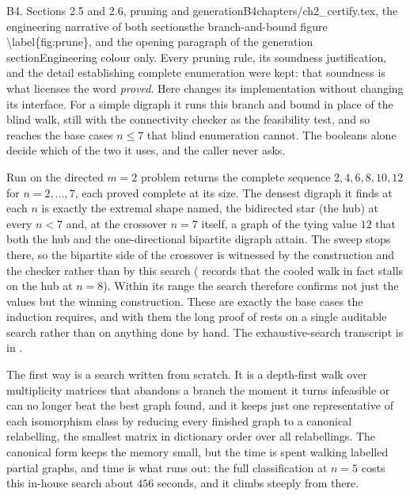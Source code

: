 \begin{offcutrewrite}{B4. Sections 2.5 and 2.6, pruning and generation}{B4}{chapters/ch2\_certify.tex, the engineering narrative of both sections}{the branch-and-bound figure \textbackslash{}label\{fig:prune\}, and the opening paragraph of the generation section}{Engineering colour only. Every pruning rule, its soundness justification, and the detail establishing complete enumeration were kept: that soundness is what licenses the word \emph{proved}.}
Here  changes its implementation without changing its interface. For a simple digraph it runs this branch and bound in place of the blind walk, still with the connectivity checker as the feasibility test, and so reaches the base cases $n \le 7$ that blind enumeration cannot. The booleans alone decide which of the two it uses, and the caller never asks.

Run on the directed $m = 2$ problem  returns the complete sequence $2, 4, 6, 8, 10, 12$ for $n = 2, \dots, 7$, each proved complete at its size. The densest digraph it finds at each $n$ is exactly the extremal shape  named, the bidirected star (the hub) at every $n < 7$ and, at the crossover $n = 7$ itself, a graph of the tying value $12$ that both the hub and the one-directional bipartite digraph attain. The sweep stops there, so the bipartite side of the crossover is witnessed by the construction and the checker rather than by this search ( records that the cooled walk in fact stalls on the hub at $n = 8$). Within its range the search therefore confirms not just the values but the winning construction. These are exactly the base cases the induction requires, and with them the long proof of  rests on a single auditable search rather than on anything done by hand. The exhaustive-search transcript is in .

The first way is a search written from scratch. It is a depth-first walk over multiplicity matrices that abandons a branch the moment it turns infeasible or can no longer beat the best graph found, and it keeps just one representative of each isomorphism class by reducing every finished graph to a canonical relabelling, the smallest matrix in dictionary order over all relabellings. The canonical form keeps the memory small, but the time is spent walking labelled partial graphs, and time is what runs out: the full classification at $n = 5$ costs this in-house search about $456$ seconds, and it climbs steeply from there.


\end{offcutrewrite}
